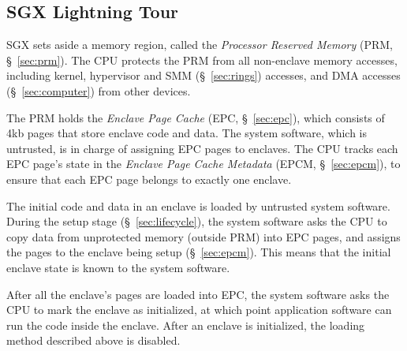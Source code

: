 \subsection{SGX Lightning Tour}
\label{sec:intro_sgx}

SGX sets aside a memory region, called the \textit{Processor Reserved Memory}
(PRM, \S~\ref{sec:prm}). The CPU protects the PRM from all non-enclave memory
accesses, including kernel, hypervisor and SMM (\S~\ref{sec:rings}) accesses,
and DMA accesses (\S~\ref{sec:computer}) from other devices.

The PRM holds the \textit{Enclave Page Cache} (EPC, \S~\ref{sec:epc}), which
consists of 4kb pages that store enclave code and data. The system software,
which is untrusted, is in charge of assigning EPC pages to enclaves. The CPU
tracks each EPC page's state in the \textit{Enclave Page Cache Metadata} (EPCM,
\S~\ref{sec:epcm}), to ensure that each EPC page belongs to exactly one
enclave.

The initial code and data in an enclave is loaded by untrusted system software.
During the setup stage (\S~\ref{sec:lifecycle}), the system software asks the
CPU to copy data from unprotected memory (outside PRM) into EPC pages, and
assigns the pages to the enclave being setup (\S~\ref{sec:epcm}). This
means that the initial enclave state is known to the system software.

After all the enclave's pages are loaded into EPC, the system software asks the
CPU to mark the enclave as initialized, at which point application software can
run the code inside the enclave. After an enclave is initialized, the loading
method described above is disabled.



